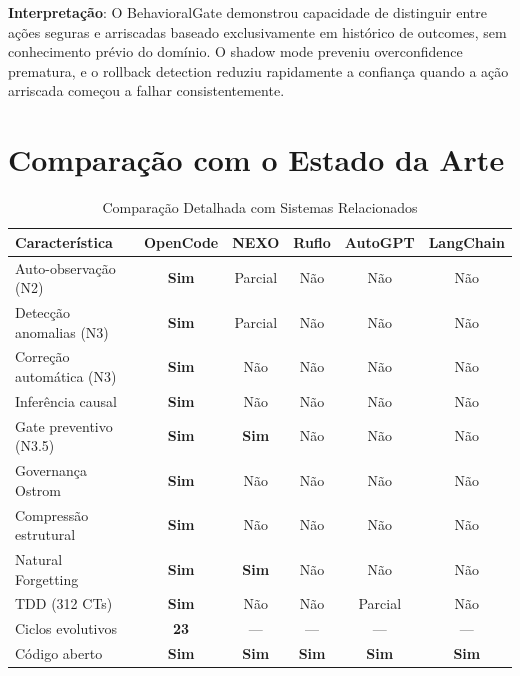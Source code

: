 \textbf{Interpretação}: O BehavioralGate demonstrou capacidade de distinguir entre ações seguras e arriscadas baseado exclusivamente em histórico de outcomes, sem conhecimento prévio do domínio. O shadow mode preveniu overconfidence prematura, e o rollback detection reduziu rapidamente a confiança quando a ação arriscada começou a falhar consistentemente.

\section{Comparação com o Estado da Arte}

\begin{table}[H]
\centering
\small
\caption{Comparação Detalhada com Sistemas Relacionados}
\label{tab:comparacao}
\begin{tabular}{lccccc}
\toprule
\textbf{Característica} & \textbf{OpenCode} & \textbf{NEXO} & \textbf{Ruflo} & \textbf{AutoGPT} & \textbf{LangChain} \\
\midrule
Auto-observação (N2) & \textbf{Sim} & Parcial & Não & Não & Não \\
Detecção anomalias (N3) & \textbf{Sim} & Parcial & Não & Não & Não \\
Correção automática (N3) & \textbf{Sim} & Não & Não & Não & Não \\
Inferência causal & \textbf{Sim} & Não & Não & Não & Não \\
Gate preventivo (N3.5) & \textbf{Sim} & \textbf{Sim} & Não & Não & Não \\
Governança Ostrom & \textbf{Sim} & Não & Não & Não & Não \\
Compressão estrutural & \textbf{Sim} & Não & Não & Não & Não \\
Natural Forgetting & \textbf{Sim} & \textbf{Sim} & Não & Não & Não \\
TDD (312 CTs) & \textbf{Sim} & Não & Não & Parcial & Não \\
Ciclos evolutivos & \textbf{23} & — & — & — & — \\
Código aberto & \textbf{Sim} & \textbf{Sim} & \textbf{Sim} & \textbf{Sim} & \textbf{Sim} \\
\bottomrule
\end{tabular}
\end{table}

